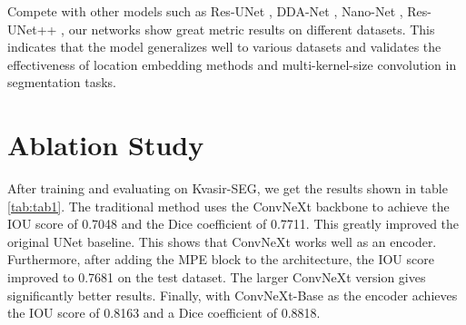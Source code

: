 \documentclass[conference]{IEEEtran}
\begin{document}
 Compete with other models such as Res-UNet \cite{resunet}, DDA-Net \cite{dda}, Nano-Net \cite{nano}, Res-UNet++ \cite{jha2019resunet++}, our networks show great metric results on different datasets. This indicates that the model generalizes well to various datasets and validates the effectiveness of location embedding methods and multi-kernel-size convolution in segmentation tasks.

\section{Ablation Study}
\label{ablation}
After training and evaluating on Kvasir-SEG, we get the results shown in table \ref{tab:tab1}. The traditional method uses the ConvNeXt backbone to achieve the IOU score of 0.7048 and the Dice coefficient of 0.7711. This greatly improved the original UNet \cite{unet} baseline. This shows that ConvNeXt works well as an encoder. Furthermore, after adding the MPE block to the architecture, the IOU score improved to 0.7681 on the test dataset. The larger ConvNeXt version gives significantly better results. Finally, with ConvNeXt-Base as the encoder achieves the IOU score of 0.8163 and a Dice coefficient of 0.8818.

\begin{table}[!h]
\begin{center}
\end{center}
\caption{Our Performance Results on Kvasir dataset.}
\label{tab:tab1}
\end{table}

\vspace{-4mm}
\end{document}
